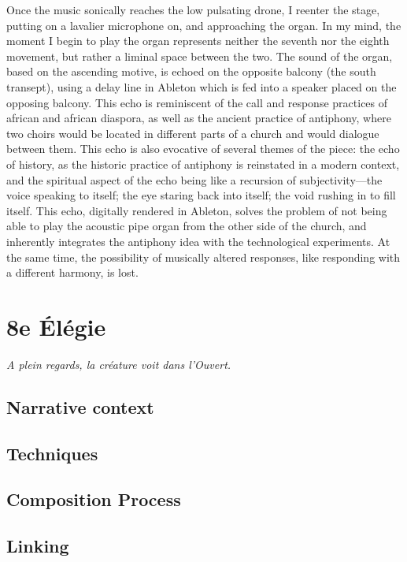\documentclass[12pt,twoside,maitrise]{dms_ks}
\theoremstyle{definition}
\begin{document}
Once the music sonically reaches the low pulsating drone, I reenter the stage, putting on a lavalier microphone on, and approaching the organ.
In my mind, the moment I begin to play the organ represents neither the seventh nor the eighth movement, but rather a liminal space between the two.
The sound of the organ, based on the ascending motive, is echoed on the opposite balcony (the south transept), using a delay line in Ableton which is fed into a speaker placed on the opposing balcony.
This echo is reminiscent of the call and response practices of african and african diaspora, as well as the ancient practice of antiphony, where two choirs would be located in different parts of a church and would dialogue between them.
This echo is also evocative of several themes of the piece: the echo of history, as the historic practice of antiphony is reinstated in a modern context, and the spiritual aspect of the echo being like a recursion of subjectivity—the voice speaking to itself; the eye staring back into itself; the void rushing in to fill itself.
This echo, digitally rendered in Ableton, solves the problem of not being able to play the acoustic pipe organ from the other side of the church, and inherently integrates the antiphony idea with the technological experiments.
At the same time, the possibility of musically altered responses, like responding with a different harmony, is lost.

\section{8e Élégie}

\epigraph{\textit{A plein regards, la créature voit dans l’Ouvert.}}{}

\subsection{Narrative context}

\subsection{Techniques}

\subsection{Composition Process}

\subsection{Linking}
\end{document}
